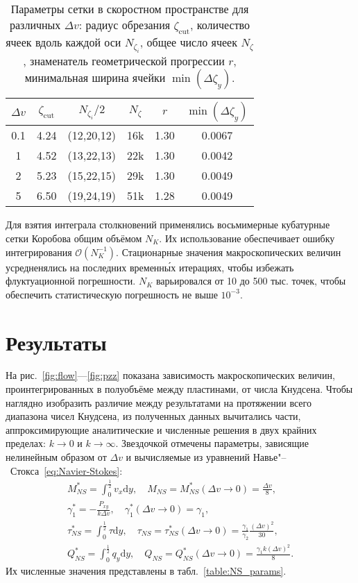 \documentclass[a4paper,12pt]{article}
\newcommand{\NS}{N\!S}
\newcommand{\dd}{\mathrm{d}}
\begin{document}
\begin{table}
    \centering
    \begin{tabular}{|c|c|c|c|c|c|}
        \hline
        \(\Delta{v}\) & \(\zeta_\mathrm{cut}\) & \(N_{\zeta_i}/2\) & \(N_\zeta\) & \(r\) & \(\min(\Delta\zeta_y)\) \\ \hline
        0.1 & 4.24 & (12,20,12) & 16k & 1.30 & 0.0067 \\ \hline
        1   & 4.52 & (13,22,13) & 22k & 1.30 & 0.0042 \\ \hline
        2   & 5.23 & (15,22,15) & 29k & 1.30 & 0.0049 \\ \hline
        5   & 6.50 & (19,24,19) & 51k & 1.28 & 0.0049 \\ \hline
    \end{tabular}
    \caption{Параметры сетки в скоростном пространстве для различных \(\Delta{v}\):
    	радиус обрезания \(\zeta_\mathrm{cut}\), количество ячеек вдоль каждой оси \(N_{\zeta_i}\),
    	общее число ячеек \(N_\zeta\), знаменатель геометрической прогрессии \(r\),
    	минимальная ширина ячейки \(\min(\Delta\zeta_y)\).}
    \label{table:velocity_mesh}
\end{table}

Для взятия интеграла столкновений применялись восьмимерные кубатурные сетки Коробова
общим объёмом \(N_K\). Их использование обеспечивает ошибку интегрирования \(\mathcal{O}(N_K^{-1})\).
Стационарные значения макроскопических величин усредненялись на последних временн\'{ы}х итерациях,
чтобы избежать флуктуационной погрешности.
\(N_K\) варьировался от 10 до 500 тыс. точек, чтобы обеспечить статистическую погрешность не выше \(10^{-3}\).

\section{Результаты}

На рис.~\ref{fig:flow}---\ref{fig:pzz} показана зависимость макроскопических величин,
проинтегрированных в полуобъёме между пластинами, от числа Кнудсена.
Чтобы наглядно изобразить различие между результатами
на протяжении всего диапазона чисел Кнудсена, из полученных данных вычитались части,
аппроксимирующие аналитические и численные решения в двух крайних пределах: \(k\to0\) и \(k\to\infty\).
Звездочкой отмечены параметры, зависящие нелинейным образом от \(\Delta{v}\) и вычисляемые
из уравнений Навье"--~Стокса~\eqref{eq:Navier-Stokes}:
\begin{gather*}
    M_{\NS}^* = \int_0^\frac12 v_x \dd{y}, \quad M_{\NS} = M_{\NS}^*(\Delta{v}\to0) = \frac{\Delta{v}}8, \\
    \gamma_1^* = -\frac{P_{xy}}{k\Delta{v}}, \quad \gamma_1^*(\Delta{v}\to0) = \gamma_1, \\
    \tau_{\NS}^* = \int_0^\frac12 \tau \dd{y}, \quad
        \tau_{\NS} = \tau_{\NS}^*(\Delta{v}\to0) = \frac{\gamma_1}{\gamma_2}\frac{(\Delta{v})^2}{30}, \\
    Q_{\NS}^* = \int_0^\frac12 q_y \dd{y}, \quad Q_{\NS} = Q_{\NS}^*(\Delta{v}\to0) = \frac{\gamma_1 k (\Delta{v})^2}8.
\end{gather*}
Их численные значения представлены в табл.~\ref{table:NS_params}.
\end{document}
